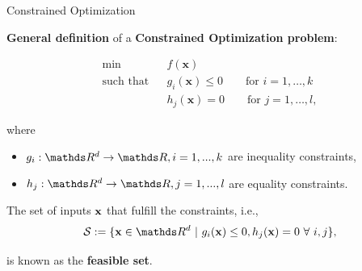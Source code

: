 \documentclass[11pt,compress,t,notes=noshow, xcolor=table]{beamer}
\begin{document}
%
%
%
%
%
%
%

\begin{vbframe}{Constrained Optimization}

\textbf{General definition} of a \textbf{Constrained Optimization problem}:

\begin{eqnarray*}
\min && f(\mathbf{x})  \\
\text{such that} && g_i(\mathbf{x}) \le 0 \qquad \text{for } i=1,\ldots,k  \\
 && h_j(\mathbf{x}) = 0 \qquad \text{for } j=1,\ldots,l,
\end{eqnarray*}

\vspace*{-0.5cm}

where

\begin{itemize}
\item $g_i: \R^d \to \R, i = 1, ..., k$ are inequality constraints,
\item $h_j: \R^d \to \R, j = 1, ..., l$ are equality constraints.
\end{itemize}

\lz 

The set of inputs $\mathbf{x}$ that fulfill the constraints, i.e.,
\begin{equation*}
    \mathcal{S} := \{\xv \in \R^d ~|~ g_i(\xv) \le 0, h_j(\xv) = 0 ~\forall~ i, j\},
\end{equation*} 

is known as the \textbf{feasible set}.

\end{vbframe}
\end{document}
